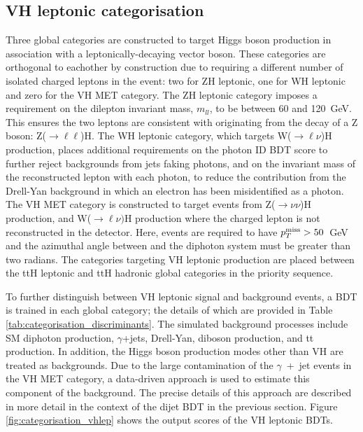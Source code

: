 \subsection{VH leptonic categorisation}
Three global categories are constructed to target Higgs boson production in association with a leptonically-decaying vector boson. These categories are orthogonal to eachother by construction due to requiring a different number of isolated charged leptons in the event: two for ZH leptonic, one for WH leptonic and zero for the VH MET category. The ZH leptonic category imposes a requirement on the dilepton invariant mass, $m_{ll}$, to be between 60 and 120~GeV. This ensures the two leptons are consistent with originating from the decay of a Z boson: Z($\rightarrow\ell\ell$)H. The WH leptonic category, which targets W($\rightarrow\ell\nu$)H production, places additional requirements on the photon ID BDT score to further reject backgrounds from jets faking photons, and on the invariant mass of the reconstructed lepton with each photon, to reduce the contribution from the Drell-Yan background in which an electron has been misidentified as a photon. The VH MET category is constructed to target events from Z($\rightarrow\nu\nu$)H production, and W($\rightarrow\ell\nu)$H production where the charged lepton is not reconstructed in the detector. Here, events are required to have $p^\textrm{miss}_{T}>50$~GeV and the azimuthal angle between \metv and the diphoton system must be greater than two radians. The categories targeting VH leptonic production are placed between the ttH leptonic and ttH hadronic global categories in the priority sequence.

To further distinguish between VH leptonic signal and background events, a BDT is trained in each global category; the details of which are provided in Table \ref{tab:categorisation_discriminants}. The simulated background processes include SM diphoton production, $\gamma$+jets, Drell-Yan, diboson production, and tt production. In addition, the Higgs boson production modes other than VH are treated as backgrounds. Due to the large contamination of the $\gamma$~+~jet events in the VH MET category, a data-driven approach is used to estimate this component of the background. The precise details of this approach are described in more detail in the context of the dijet BDT in the previous section. Figure \ref{fig:categorisation_vhlep} shows the output scores of the VH leptonic BDTs.

